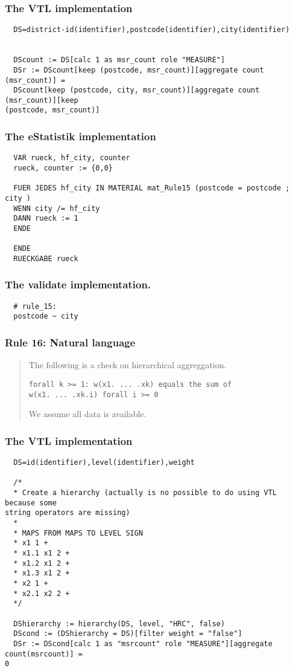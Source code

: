 \subsubsection*{The VTL implementation}
\begin{verbatim}
  DS=district-id(identifier),postcode(identifier),city(identifier)


  DScount := DS[calc 1 as msr_count role "MEASURE"]
  DSr := DScount[keep (postcode, msr_count)][aggregate count (msr_count)] =
  DScount[keep (postcode, city, msr_count)][aggregate count (msr_count)][keep
(postcode, msr_count)]
\end{verbatim}
\subsubsection*{The eStatistik implementation}
\begin{verbatim}
  VAR rueck, hf_city, counter
  rueck, counter := {0,0}

  FUER JEDES hf_city IN MATERIAL mat_Rule15 (postcode = postcode ; city )
  WENN city /= hf_city
  DANN rueck := 1
  ENDE

  ENDE
  RUECKGABE rueck
\end{verbatim}
\subsubsection*{The validate implementation.}
\begin{verbatim}
  # rule_15:
  postcode ~ city
\end{verbatim}


\newpage

\subsubsection*{  Rule 16: Natural language}
\begin{quote}


The following is a check on hierarchical aggreggation.

\begin{verbatim}
forall k >= 1: w(x1. ... .xk) equals the sum of
w(x1. ... .xk.i) forall i >= 0
\end{verbatim}

We assume all data is available.



\end{quote}
\subsubsection*{The VTL implementation}
\begin{verbatim}
  DS=id(identifier),level(identifier),weight

  /*
  * Create a hierarchy (actually is no possible to do using VTL because some
string operators are missing)
  *
  * MAPS FROM MAPS TO LEVEL SIGN
  * x1 1 +
  * x1.1 x1 2 +
  * x1.2 x1 2 +
  * x1.3 x1 2 +
  * x2 1 +
  * x2.1 x2 2 +
  */

  DShierarchy := hierarchy(DS, level, "HRC", false)
  DScond := (DShierarchy = DS)[filter weight = "false"]
  DSr := DScond[calc 1 as "msrcount" role "MEASURE"][aggregate count(msrcount)] =
0
\end{verbatim}
